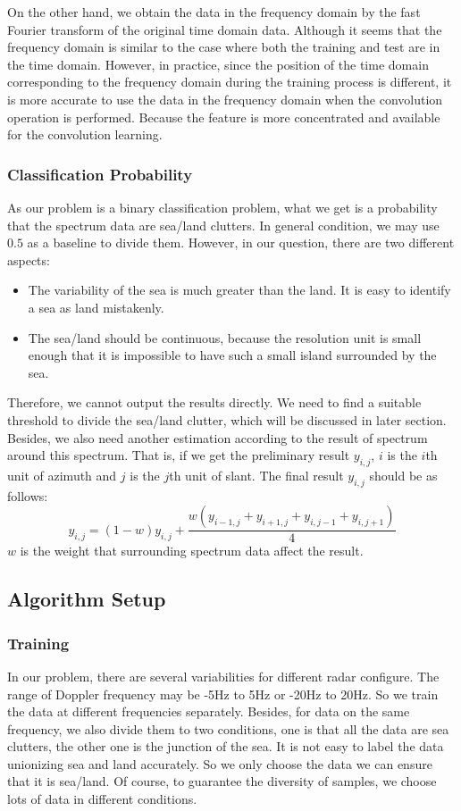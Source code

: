 On the other hand, we obtain the data in the frequency domain by the fast Fourier transform of the original time domain data. Although it seems that the frequency domain is similar to the case where both the training and test are in the time domain. However, in practice, since the position of the time domain corresponding to the frequency domain during the training process is different, it is more accurate to use the data in the frequency domain when the convolution operation is performed. Because the feature is more concentrated and available for the convolution learning.

\subsubsection{Classification Probability}
As our problem is a binary classification problem, what we get is a probability that the spectrum data are sea/land clutters. In general condition, we may use $0.5$ as a baseline to divide them. However, in our question, there are two different aspects:
\begin{itemize}
	\item The variability of the sea is much greater than the land. It is easy to identify a sea as land mistakenly.
	\item The sea/land should be continuous, because the resolution unit is small enough that it is impossible to have such a small island surrounded by the sea.
\end{itemize}
Therefore, we cannot output the results directly. We need to find a suitable threshold to divide the sea/land clutter, which will be discussed in later section. Besides, we also need another estimation according to the result of spectrum around this spectrum. That is, if we get the preliminary result $y_{i, j}$, $i$ is the $i$th unit of azimuth and $j$ is the $j$th unit of slant. The final result $y_{i, j}$ should be as follows:
\begin{equation}
y_{i, j} = (1 - w)  y_{i, j} + \frac{w  (y_{i - 1, j} + y_{i + 1, j} + y_{i, j - 1} + y_{i, j + 1})}{4}
\end{equation}
$w$ is the weight that surrounding spectrum data affect the result.
\subsection{Algorithm Setup}

\subsubsection{Training}
In our problem, there are several variabilities for different radar configure. The range of Doppler frequency may be -5Hz to 5Hz or -20Hz to 20Hz. So we train the data at different frequencies separately. Besides, for data on the same frequency, we also divide them to two conditions, one is that all the data are sea clutters, the other one is the junction of the sea. It is not easy to label the data unionizing sea and land accurately. So we only choose the data we can ensure that it is sea/land. Of course, to guarantee the diversity of samples, we choose lots of data in different conditions.
